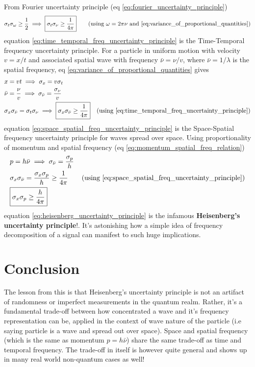 \documentclass[11pt, a4paper]{article}
\let\oldsection\section
\renewcommand{\section}{%
	\setcounter{equation}{0}%
	\oldsection%
}
\newcommand{\stdev}[1]{\sigma_{#1}}
\begin{document}
From Fourier uncertainty principle (eq \eqref{eq:fourier_uncertainty_principle})
\begin{equation}\label{eq:time_temporal_freq_uncertainty_principle}
	\stdev{t} \stdev{\omega} \geq \frac{1}{2} \implies \boxed{\stdev{t} \stdev{\nu} \geq \frac{1}{4\pi}} \qquad \text{(using $\omega = 2\pi \nu$ and \eqref{eq:variance_of_proportional_quantities})}
\end{equation}
equation \eqref{eq:time_temporal_freq_uncertainty_principle} is the Time-Temporal frequency uncertainty principle. For a particle in uniform motion with velocity $v = x / t$ and associated spatial wave with frequency $\bar{\nu} = \nu / v$, where $\bar{\nu} = 1/\lambda$ is the spatial frequency, eq \eqref{eq:variance_of_proportional_quantities} gives
\begin{align}
 	& x = vt \implies \stdev{x} = v\stdev{t} \nonumber \\
 	& \bar{\nu} = \frac{\nu}{v} \implies \stdev{\bar{\nu}} = \frac{\stdev{\nu}}{v} \nonumber \\
 	& \stdev{x}\stdev{\bar{\nu}} = \stdev{t} \stdev{\nu} \implies \boxed{\stdev{x}\stdev{\bar{\nu}} \geq \frac{1}{4\pi}} \quad \text{(using \eqref{eq:time_temporal_freq_uncertainty_principle})} \label{eq:space_spatial_freq_uncertainty_principle}
\end{align}
equation \eqref{eq:space_spatial_freq_uncertainty_principle} is the Space-Spatial frequency uncertainty principle for waves spread over space. Using proportionality of momentum and spatial frequency (eq \eqref{eq:momentum_spatial_freq_relation})
\begin{align}
	& p = h \bar{\nu} \implies \stdev{\bar{\nu}} = \frac{\stdev{p}}{h}  \nonumber \\
	& \stdev{x}\stdev{\bar{\nu}} = \frac{\stdev{x}\stdev{p}}{h} \geq \frac{1}{4 \pi} \nonumber \tag{using \eqref{eq:space_spatial_freq_uncertainty_principle}} \\
	& \boxed{\stdev{x}\stdev{p} \geq \frac{h}{4 \pi}} \label{eq:heisenberg_uncertainty_principle}
\end{align}
equation \eqref{eq:heisenberg_uncertainty_principle} is the infamous \textbf{Heisenberg's uncertainty principle}!. It's astonishing how a simple idea of frequency decomposition of a signal can manifest to such huge implications.

\section{Conclusion}
The lesson from this is that Heisenberg's uncertainty principle is not an artifact of randomness or imperfect measurements in the quantum realm. Rather, it's a fundamental trade-off between how concentrated a wave and it's frequency representation can be, applied in the context of wave nature of the particle (i.e saying particle is a wave and spread out over space). Space and spatial frequency (which is the same as momentum $p=h\bar{\nu}$) share the same trade-off as time and temporal frequency. The trade-off in itself is however quite general and shows up in many real world non-quantum cases as well!
\end{document}
